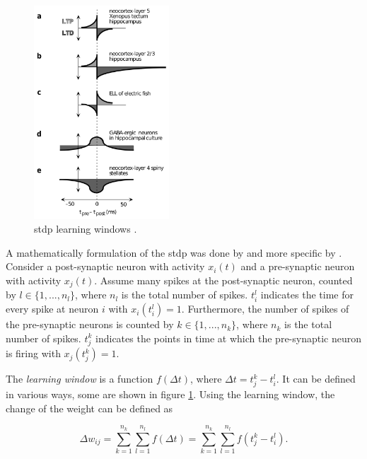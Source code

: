 \begin{figure}
	\centering
	\includegraphics[width=0.45\textwidth]{neurons_plasticity/learning-window.png}
	\caption[Learning windows]{\ac{stdp} learning windows \parencite[figure 2]{abbott2000synaptic}.}
    \label{fig:learning-windows}
    \vspace{-10pt}
\end{figure}

A mathematically formulation of the \ac{stdp} was done by \textcite{sjostrom2010spike} and more specific by \textcite{kempter1999hebbian}. Consider a post-synaptic neuron with activity $x_i(t)$ and a pre-synaptic neuron with activity $x_j(t)$. Assume many spikes at the post-synaptic neuron, counted by $l \in \{ 1,...,n_l \}$, where $n_l$ is the total number of spikes. $t_i^l$ indicates the time for every spike at neuron $i$ with $x_i(t_i^l) = 1$. Furthermore, the number of spikes of the pre-synaptic neurons is counted by $k \in \{ 1,...,n_k \}$, where $n_k$ is the total number of spikes. $t_j^k$ indicates the points in time at which the pre-synaptic neuron is firing with $x_j(t_j^k) = 1$.

The \emph{learning window} is a function $f(\Delta t)$, where $\Delta t = t_j^k - t_i^l$. It can be defined in various ways, some are shown in figure \ref{fig:learning-windows}. Using the learning window, the change of the weight can be defined as

\begin{equation}
\label{eq:stdp-orig}
\Delta w_{ij} = \sum_{k=1}^{n_k} \sum_{l=1}^{n_l} f(\Delta t) = \sum_{k=1}^{n_k} \sum_{l=1}^{n_l} f(t_j^k - t_i^l).
\end{equation}


